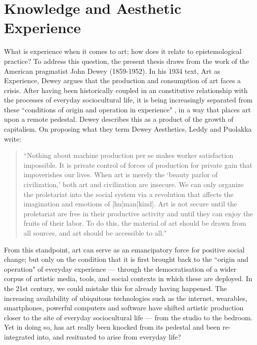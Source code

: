 \section{Knowledge and Aesthetic Experience}\label{sec: introduction-aestheticexperience}
What is experience when it comes to art; how does it relate to epistemological practice? To address this question, the present thesis draws from the work of the American pragmatist John Dewey (1859-1952). In his 1934 text, Art as Experience, Dewey argues that the production and consumption of art faces a crisis. After having been historically coupled in an constitutive relationship with the processes of everyday sociocultural life, it is being increasingly separated from these ``conditions of origin and operation in experience" \citep{dewey1934}, in a way that places art upon a remote pedestal. Dewey describes this as a product of the growth of capitalism. On proposing what they term Dewey Aesthetics, Leddy and Puolakka write:
\begin{quote}
    ``Nothing about machine production per se makes worker satisfaction impossible. It is private control of forces of production for private gain that impoverishes our lives. When art is merely the `beauty parlor of civilization,' both art and civilization are insecure. We can only organize the proletariat into the social system via a revolution that affects the imagination and emotions of [hu]man[kind]. Art is not secure until the proletariat are free in their productive activity and until they can enjoy the fruits of their labor. To do this, the material of art should be drawn from all sources, and art should be accessible to all." \citep{leddy2021}
\end{quote}
From this standpoint, art can serve as an emancipatory force for positive social change; but only on the condition that it is first brought back to the ``origin and operation" of everyday experience — through the democratisation of a wider corpus of artistic media, tools, and social contexts in which these are deployed. In the 21st century, we could mistake this for already having happened. The increasing availability of ubiquitous technologies such as the internet, wearables, smartphones, powerful computers and software have shifted artistic production closer to the site of everyday sociocultural life — from the studio to the bedroom. Yet in doing so, has art really been knocked from its pedestal and been re-integrated into, and resituated to arise from everyday life? 

